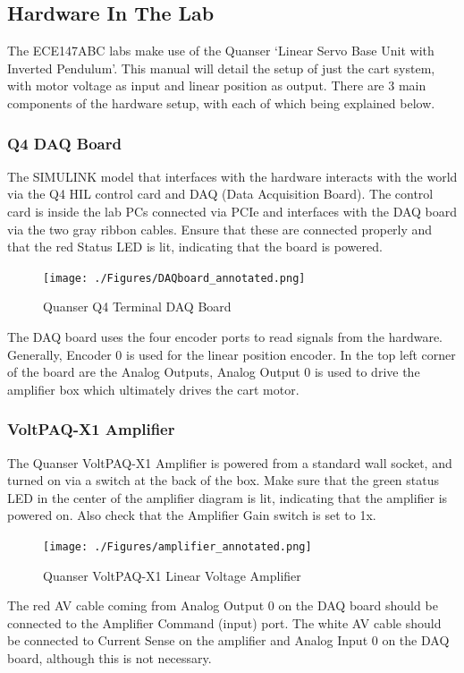 \documentclass[11pt,letterpaper]{article}
\begin{document}
\subsection*{Hardware In The Lab}
The ECE147ABC labs make use of the Quanser `Linear Servo Base Unit with Inverted Pendulum'. This manual will detail the setup of just the cart system, with motor voltage as input and linear position as output. There are 3 main components of the hardware setup, with each of which being explained below.

\subsubsection*{Q4 DAQ Board}
The SIMULINK model that interfaces with the hardware interacts with the world via the Q4 HIL control card and DAQ (Data Acquisition Board). The control card is inside the lab PCs connected via PCIe and interfaces with the DAQ board via the two gray ribbon cables. Ensure that these are connected properly and that the red Status LED is lit, indicating that the board is powered.
\begin{figure}[H]
  \centering
  \texttt{[image: ./Figures/DAQboard\_annotated.png]}
  \caption{Quanser Q4 Terminal DAQ Board}
\end{figure}
The DAQ board uses the four encoder ports to read signals from the hardware. Generally, Encoder 0 is used for the linear position encoder. In the top left corner of the board are the Analog Outputs, Analog Output 0 is used to drive the amplifier box which ultimately drives the cart motor.



\subsubsection*{VoltPAQ-X1 Amplifier}
The Quanser VoltPAQ-X1 Amplifier is powered from a standard wall socket, and turned on via a switch at the back of the box. Make sure that the green status LED in the center of the amplifier diagram is lit, indicating that the amplifier is powered on. Also check that the Amplifier Gain switch is set to 1x.


\begin{figure}[H]
  \centering
  \texttt{[image: ./Figures/amplifier\_annotated.png]}
  \caption{Quanser VoltPAQ-X1 Linear Voltage Amplifier}
\end{figure}

The red AV cable coming from Analog Output 0 on the DAQ board should be connected to the Amplifier Command (input) port. The white AV cable should be connected to Current Sense on the amplifier and Analog Input 0 on the DAQ board, although this is not necessary. \\
\end{document}
